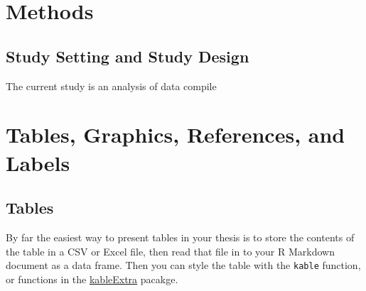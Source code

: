\documentclass [11pt, proquest] {uwthesis}[2015/03/03]
\begin{document}
\chapter{Methods}\label{math-sci}

\section{Study Setting and Study
Design}\label{study-setting-and-study-design}

The current study is an analysis of data compile

\hypertarget{ref-labels}{\chapter{Tables, Graphics, References, and
Labels}\label{ref-labels}}

\hypertarget{tables}{\section{Tables}\label{tables}}

By far the easiest way to present tables in your thesis is to store the
contents of the table in a CSV or Excel file, then read that file in to
your R Markdown document as a data frame. Then you can style the table
with the \texttt{kable} function, or functions in the
\href{https://cran.r-project.org/web/packages/kableExtra/index.html}{kableExtra}
pacakge.
\end{document}
